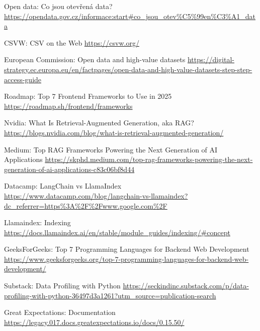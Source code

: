 \begin{thebibliography}{99}


Open data: Co jsou otevřená data?
\url{https://opendata.gov.cz/informace:start#co_jsou_otev\%C5\%99en\%C3\%A1_data}

CSVW: CSV on the Web
\url{https://csvw.org/}

European Commission: Open data and high-value datasets
\url{https://digital-strategy.ec.europa.eu/en/factpages/open-data-and-high-value-datasets-step-step-access-guide}

Roadmap: Top 7 Frontend Frameworks to Use in 2025
\url{https://roadmap.sh/frontend/frameworks}

Nvidia: What Is Retrieval-Augmented Generation, aka RAG?
\url{https://blogs.nvidia.com/blog/what-is-retrieval-augmented-generation/}

Medium: Top RAG Frameworks Powering the Next Generation of AI Applications
\url{https://skphd.medium.com/top-rag-frameworks-powering-the-next-generation-of-ai-applications-c83c06bf8d44}

Datacamp: LangChain vs LlamaIndex
\url{https://www.datacamp.com/blog/langchain-vs-llamaindex?dc_referrer=https\%3A\%2F\%2Fwww.google.com\%2F}

Llamaindex: Indexing
\url{https://docs.llamaindex.ai/en/stable/module_guides/indexing/\#concept}

GeeksForGeeks: Top 7 Programming Languages for Backend Web Development
\url{https://www.geeksforgeeks.org/top-7-programming-languages-for-backend-web-development/}


Substack: Data Profiling with Python
\url{https://seckindinc.substack.com/p/data-profiling-with-python-36497d3a1261?utm_source=publication-search}

Great Expectations: Documentation
\url{https://legacy.017.docs.greatexpectations.io/docs/0.15.50/}


\end{thebibliography}
